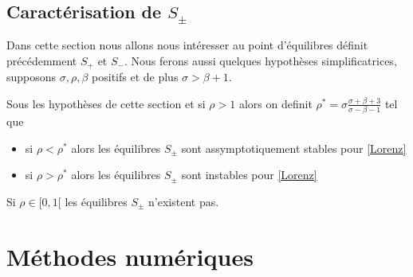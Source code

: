 \documentclass{article}
\newtheorem[M , nocut]{prop}{Proposition}[section]
\newtheorem[S , nocut]{definition}{Définition}
\newtheorem[S , nocut]{lemme}{Lemme}
\newtheorem[L , nocut]{thm}{Théoreme}
\newtheorem[L , nocut]{cor}{Corollaire}
\begin{document}
\subsection{Caractérisation de $S_\pm$}

Dans cette section nous allons nous intéresser au point d'équilibres définit précédemment $S_+$ et $S_-$. Nous ferons aussi quelques hypothèses simplificatrices, supposons $\sigma,\rho,\beta$ positifs et de plus $\sigma>\beta+1$.

\begin{prop}
    Sous les hypothèses de cette section et si $\rho > 1$ alors on definit $\rho^* = \sigma \frac{\sigma+\beta+3}{\sigma-\beta-1}$ tel que 
    \begin{itemize}
        \item si $\rho < \rho^* $ alors les équilibres $S_\pm$ sont assymptotiquement stables pour \eqref{Lorenz}
        \item si $\rho > \rho^* $ alors les équilibres $S_\pm$ sont instables pour \eqref{Lorenz}
    \end{itemize}
\end{prop}

\begin{example}[Remarque]
    Si $\rho \in [0,1[$ les équilibres $S_\pm$ n'existent pas.
\end{example}
\newpage
\section{Méthodes numériques}
\end{document}
